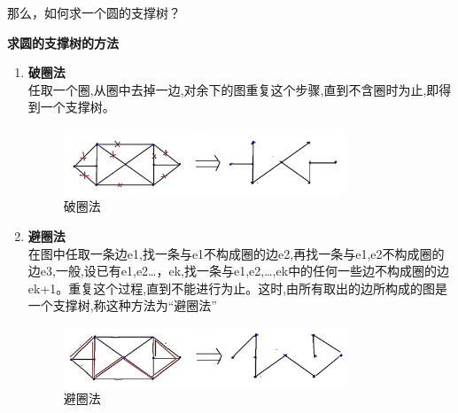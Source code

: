 	那么，如何求一个圆的支撑树？
	\begin{notebox}\textbf{{求圆的支撑树的方法}}{}
		\begin{enumerate}
			\item \textbf{破圈法}\\
			任取一个圈,从圈中去掉一边,对余下的图重复这个步骤,直到不含圈时为止,即得到一个支撑树。
			\begin{figure}[H]
				\centering
				\includegraphics[width=0.8\textwidth]{./image/33.png}
				\caption{破圈法}
				\label{fig:Chapter4_Temporary_Pavilion_1}
			\end{figure}
			\item \textbf{避圈法}\\
			在图中任取一条边e1,找一条与e1不构成圈的边e2,再找一条与{e1,e2}不构成圈的边e3,一般,设已有{e1,e2…，ek},找一条与{e1,e2,…,ek}中的任何一些边不构成圈的边ek+1。重复这个过程,直到不能进行为止。这时,由所有取出的边所构成的图是一个支撑树,称这种方法为“避圈法”
			\begin{figure}[H]
				\centering
				\includegraphics[width=0.8\textwidth]{./image/34.png}
				\caption{避圈法}
				\label{fig:Chapter4_Temporary_Pavilion_1}
			\end{figure}
		\end{enumerate}
	\end{notebox}

